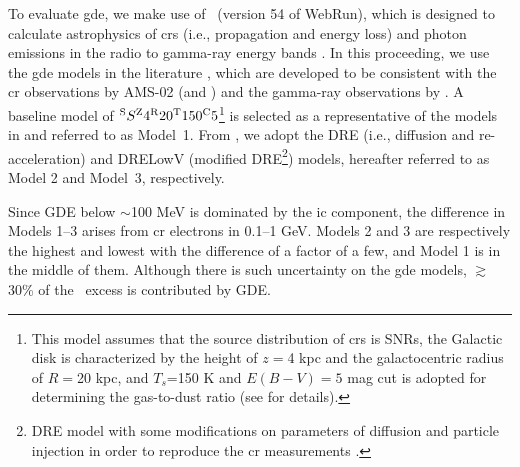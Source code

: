 \documentclass[a4paper,11pt]{article}
\begin{document}
To evaluate \acf{gde}, we make use of \galprop\ (version 54 of WebRun), which is designed to calculate astrophysics of \acp{cr} (i.e., propagation and energy loss) and photon emissions in the radio to gamma-ray energy bands \citep{porter_high-energy_2017}.
In this proceeding, we use the \ac{gde} models in the literature \cite{ackermann_fermi_2012,orlando_imprints_2018}, which are developed to be consistent with the \ac{cr} observations by AMS-02 (and \voyager) and the gamma-ray observations by \lat.
A baseline model of 
$^{\rm S}S ^{\rm Z}4 ^{\rm R}20 ^{\rm T}150 ^{\rm C}5$\footnote{This model assumes that the source distribution of \acp{cr} is SNRs, the Galactic disk is characterized by the height of $z=$4 kpc and the galactocentric radius of $R=$20 kpc, and $T_s$=150 K and $E(B-V) = 5 $ mag cut is adopted for determining the gas-to-dust ratio (see \cite{ackermann_fermi_2012} for details).} 
is selected as a representative of the models in \cite{ackermann_fermi_2012} and referred to as Model~1. 
From \cite{orlando_imprints_2018}, we adopt the DRE (i.e., diffusion and re-acceleration) and DRELowV (modified DRE\footnote{
DRE model with some modifications on parameters of diffusion and particle injection in order to reproduce the \ac{cr} measurements \cite{orlando_imprints_2018}.}) models, hereafter referred to as Model 2 and Model~3, respectively.

Since GDE below $\sim$100 MeV is dominated by the \ac{ic} component, the difference in Models 1--3 arises from \ac{cr} electrons in 0.1--1 GeV.
Models 2 and 3 are respectively the highest and lowest with the difference of a factor of a few, and Model 1 is in the middle of them.
Although there is such uncertainty on the \ac{gde} models, $\gtrsim$30\% of the \comptel\ excess is contributed by GDE.
\end{document}

